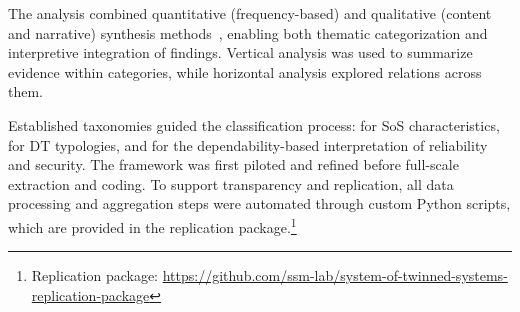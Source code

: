The analysis combined quantitative (frequency-based) and qualitative (content and narrative) synthesis methods~\cite{franzosi2010quantitative, rodgers2009testing}, enabling both thematic categorization and interpretive integration of findings. Vertical analysis was used to summarize evidence within categories, while horizontal analysis explored relations across them.

Established taxonomies guided the classification process: \citet{nielsen2015systems} for SoS characteristics, \citet{kritzinger2018digital, david2024infonomics} for DT typologies, and \citet{avizienis2004basic} for the dependability-based interpretation of reliability and security. The framework was first piloted and refined before full-scale extraction and coding. To support transparency and replication, all data processing and aggregation steps were automated through custom Python scripts, which are provided in the replication package.\footnote{Replication package: \url{https://github.com/ssm-lab/system-of-twinned-systems-replication-package}}